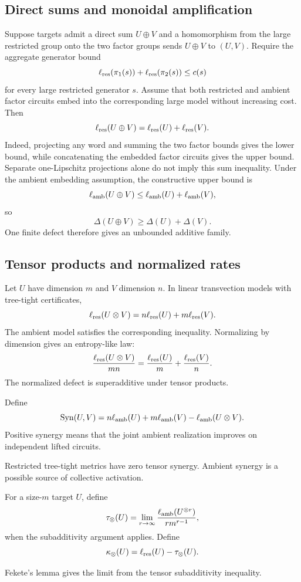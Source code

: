 \subsection{Direct sums and monoidal amplification}
Suppose targets admit a direct sum $U\oplus V$ and a homomorphism from the large restricted group onto the two factor groups sends $U\oplus V$ to $(U,V)$.  Require the aggregate generator bound
\[
\ell_{\mathrm{res}}(\pi_1(s))+\ell_{\mathrm{res}}(\pi_2(s))\le c(s)
\]
for every large restricted generator $s$.  Assume that both restricted and ambient factor circuits embed into the corresponding large model without increasing cost.  Then
\[
\ell_{\mathrm{res}}(U\oplus V)
=
\ell_{\mathrm{res}}(U)+\ell_{\mathrm{res}}(V).
\]
Indeed, projecting any word and summing the two factor bounds gives the lower bound, while concatenating the embedded factor circuits gives the upper bound.  Separate one-Lipschitz projections alone do not imply this sum inequality.
Under the ambient embedding assumption, the constructive upper bound is
\[
\ell_{\mathrm{amb}}(U\oplus V)
\le
\ell_{\mathrm{amb}}(U)+\ell_{\mathrm{amb}}(V),
\]
so
\[
\Delta(U\oplus V)
\ge
\Delta(U)+\Delta(V).
\]
One finite defect therefore gives an unbounded additive family.

\subsection{Tensor products and normalized rates}
Let $U$ have dimension $m$ and $V$ dimension $n$.  In linear transvection models with tree-tight certificates,
\[
\ell_{\mathrm{res}}(U\otimes V)
=
n\ell_{\mathrm{res}}(U)+m\ell_{\mathrm{res}}(V).
\]
The ambient model satisfies the corresponding inequality.  Normalizing by dimension gives an entropy-like law:
\[
\frac{\ell_{\mathrm{res}}(U\otimes V)}{mn}
=
\frac{\ell_{\mathrm{res}}(U)}m+
\frac{\ell_{\mathrm{res}}(V)}n.
\]
The normalized defect is superadditive under tensor products.

\begin{definition}
Define
\[
\operatorname{Syn}(U,V)
=
n\ell_{\mathrm{amb}}(U)+m\ell_{\mathrm{amb}}(V)-\ell_{\mathrm{amb}}(U\otimes V).
\]
Positive synergy means that the joint ambient realization improves on independent lifted circuits.
\end{definition}
Restricted tree-tight metrics have zero tensor synergy.  Ambient synergy is a possible source of collective activation.

\begin{definition}
For a size-$m$ target $U$, define
\[
\tau_\otimes(U)
=
\lim_{r\to\infty}
\frac{\ell_{\mathrm{amb}}(U^{\otimes r})}{r m^{r-1}},
\]
when the subadditivity argument applies.  Define
\[
\kappa_\otimes(U)
=
\ell_{\mathrm{res}}(U)-\tau_\otimes(U).
\]
\end{definition}
Fekete's lemma gives the limit from the tensor subadditivity inequality.

